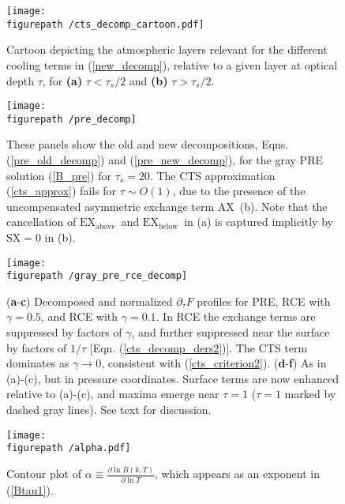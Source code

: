 \documentclass{ametsoc}
\newcommand{\eqnref}[1]{(\ref{#1})}
\newcommand{\partialder}[2]{\ensuremath{\frac{\partial #1}{\partial #2}}}
\newcommand{\pptau}{\ensuremath{\partial_\tau}}
\newcommand{\taus}{\ensuremath{\tau_s}}
\newcommand{\SX}{\ensuremath{\mathrm{SX}}}
\newcommand{\AX}{\ensuremath{\mathrm{AX}}}
\newcommand{\EXbelow}{\ensuremath{\mathrm{EX_{below}}}}
\newcommand{\EXabove}{\ensuremath{\mathrm{EX_{above}}}}
\newcommand{\figurepath}{../plots/}
\begin{document}


\begin{figure}[h!]
	\begin{center}
			\texttt{[image: \\figurepath /cts\_decomp\_cartoon.pdf]}
		\caption{Cartoon depicting the atmospheric layers relevant for the different cooling terms in \eqnref{new_decomp}, relative to a given layer at optical depth $\tau$, for \textbf{(a)} $\tau < \taus/2$  and \textbf{(b)} $\tau>\taus/2$.
		\label{decomp_cartoon}
		}
	\end{center}
\end{figure}

\begin{figure}[h]
	\begin{center}
			\texttt{[image: \\figurepath /pre\_decomp]}
		\caption{These panels show the old and new decompositions, Eqns. \eqnref{pre_old_decomp}  and  \eqnref{pre_new_decomp}, for the gray PRE solution \eqnref{B_pre} for $\taus=20$. The CTS approximation \eqnref{cts_approx} fails for $\tau\sim O(1)$, due to the presence of the uncompensated asymmetric exchange term \AX\ (b). Note that the cancellation of \EXabove\ and \EXbelow\ in (a) is captured implicitly by $\SX=0$ in (b).
		\label{pre_decomp}
		}
	\end{center}
\end{figure}

\begin{figure}[h]
	\begin{center}
			\texttt{[image: \\figurepath /gray\_pre\_rce\_decomp]}
		\caption{(\textbf{a}-\textbf{c}) Decomposed and normalized $\pptau F$ profiles for PRE, RCE with $\gamma=0.5$, and RCE with $\gamma=0.1$. In RCE the exchange terms are suppressed by factors of $\gamma$, and further suppressed near the surface by factors of $1/\tau$ [Eqn. \eqnref{cts_decomp_ders2}]. The CTS term dominates as $\gamma\rightarrow 0$, consistent with \eqnref{cts_criterion2}. 
		(\textbf{d}-\textbf{f}) As in (a)-(c), but in pressure coordinates. Surface terms are now enhanced relative to (a)-(c), and maxima emerge near  $\tau= 1$ ($\tau=1$ marked by dashed gray lines). See text for discussion.
		\label{gray_rce}
		}
	\end{center}
\end{figure}

\begin{figure}[h]
	\begin{center}
			\texttt{[image: \\figurepath /alpha.pdf]}
		\caption{Contour plot of $\alpha \equiv \partialder{\ln B(k,T)}{\ln T}$, which appears as an exponent in \eqnref{Btau1}.  
		\label{alpha}
		}
	\end{center}
\end{figure}
\end{document}
